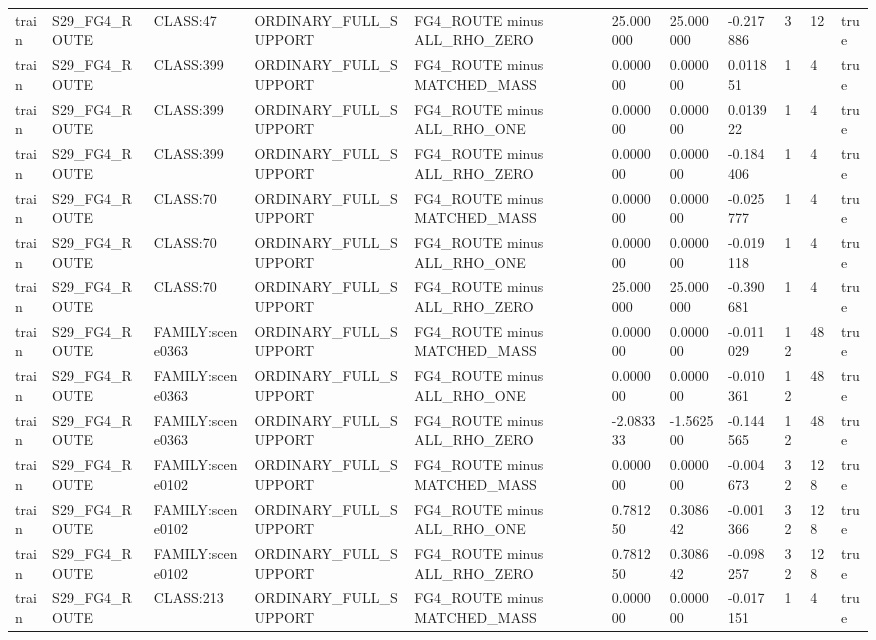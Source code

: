 \begin{tabular}{lllllllllll}
train & S29\_FG4\_ROUTE & CLASS:47 & ORDINARY\_FULL\_SUPPORT & FG4\_ROUTE minus ALL\_RHO\_ZERO & 25.000000 & 25.000000 & -0.217886 & 3 & 12 & true \\
train & S29\_FG4\_ROUTE & CLASS:399 & ORDINARY\_FULL\_SUPPORT & FG4\_ROUTE minus MATCHED\_MASS & 0.000000 & 0.000000 & 0.011851 & 1 & 4 & true \\
train & S29\_FG4\_ROUTE & CLASS:399 & ORDINARY\_FULL\_SUPPORT & FG4\_ROUTE minus ALL\_RHO\_ONE & 0.000000 & 0.000000 & 0.013922 & 1 & 4 & true \\
train & S29\_FG4\_ROUTE & CLASS:399 & ORDINARY\_FULL\_SUPPORT & FG4\_ROUTE minus ALL\_RHO\_ZERO & 0.000000 & 0.000000 & -0.184406 & 1 & 4 & true \\
train & S29\_FG4\_ROUTE & CLASS:70 & ORDINARY\_FULL\_SUPPORT & FG4\_ROUTE minus MATCHED\_MASS & 0.000000 & 0.000000 & -0.025777 & 1 & 4 & true \\
train & S29\_FG4\_ROUTE & CLASS:70 & ORDINARY\_FULL\_SUPPORT & FG4\_ROUTE minus ALL\_RHO\_ONE & 0.000000 & 0.000000 & -0.019118 & 1 & 4 & true \\
train & S29\_FG4\_ROUTE & CLASS:70 & ORDINARY\_FULL\_SUPPORT & FG4\_ROUTE minus ALL\_RHO\_ZERO & 25.000000 & 25.000000 & -0.390681 & 1 & 4 & true \\
train & S29\_FG4\_ROUTE & FAMILY:scene0363 & ORDINARY\_FULL\_SUPPORT & FG4\_ROUTE minus MATCHED\_MASS & 0.000000 & 0.000000 & -0.011029 & 12 & 48 & true \\
train & S29\_FG4\_ROUTE & FAMILY:scene0363 & ORDINARY\_FULL\_SUPPORT & FG4\_ROUTE minus ALL\_RHO\_ONE & 0.000000 & 0.000000 & -0.010361 & 12 & 48 & true \\
train & S29\_FG4\_ROUTE & FAMILY:scene0363 & ORDINARY\_FULL\_SUPPORT & FG4\_ROUTE minus ALL\_RHO\_ZERO & -2.083333 & -1.562500 & -0.144565 & 12 & 48 & true \\
train & S29\_FG4\_ROUTE & FAMILY:scene0102 & ORDINARY\_FULL\_SUPPORT & FG4\_ROUTE minus MATCHED\_MASS & 0.000000 & 0.000000 & -0.004673 & 32 & 128 & true \\
train & S29\_FG4\_ROUTE & FAMILY:scene0102 & ORDINARY\_FULL\_SUPPORT & FG4\_ROUTE minus ALL\_RHO\_ONE & 0.781250 & 0.308642 & -0.001366 & 32 & 128 & true \\
train & S29\_FG4\_ROUTE & FAMILY:scene0102 & ORDINARY\_FULL\_SUPPORT & FG4\_ROUTE minus ALL\_RHO\_ZERO & 0.781250 & 0.308642 & -0.098257 & 32 & 128 & true \\
train & S29\_FG4\_ROUTE & CLASS:213 & ORDINARY\_FULL\_SUPPORT & FG4\_ROUTE minus MATCHED\_MASS & 0.000000 & 0.000000 & -0.017151 & 1 & 4 & true \\

\end{tabular}
